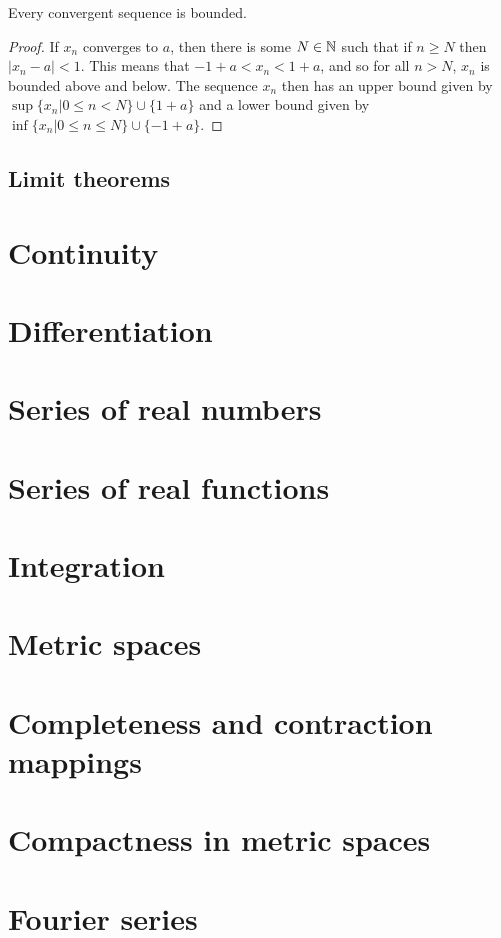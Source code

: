\begin{theorem}
  Every convergent sequence is bounded.
\end{theorem}

\begin{proof}
  If \(x_{n}\) converges to \(a\), then there is some \(N \in \mathbb{N}\) such that if \(n \geq N\) then \(|x_{n} - a| < 1\). This means that \(-1 + a < x_{n} < 1 + a\), and so for all \(n > N\), \(x_{n}\) is bounded above and below. The sequence \(x_{n}\) then has an upper bound given by \(\sup \{x_{n} | 0 \leq n < N\} \cup \{1 + a\}\) and a lower bound given by \(\inf \{x_{n} | 0 \leq n \leq N\} \cup \{-1 + a\}\).
\end{proof}


\subsection{Limit theorems}



\section{Continuity}

\section{Differentiation}

\section{Series of real numbers}

\section{Series of real functions}

\section{Integration}

\section{Metric spaces}

\section{Completeness and contraction mappings}

\section{Compactness in metric spaces}

\section{Fourier series}

